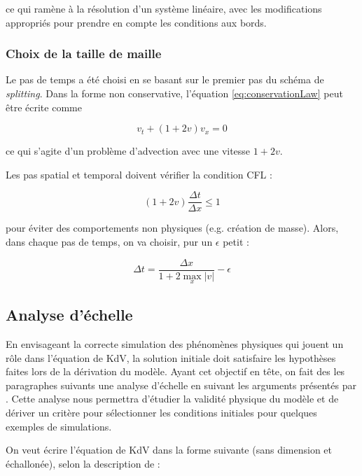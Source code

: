 \noindent ce qui ramène à la résolution d'un système linéaire, avec les modifications appropriés pour prendre en compte les conditions aux bords.

\subsubsection{Choix de la taille de maille}

\indent Le pas de temps a été choisi en se basant sur le premier pas du schéma de \emph{splitting}. Dans la forme non conservative, l'équation \eqref{eq:conservationLaw} peut être écrite comme

\begin{equation*}
v_t +  (1+2v)v_x = 0
\end{equation*}

\noindent ce qui s'agite d'un problème d'advection avec une vitesse $1+2v$.

\indent Les pas spatial et temporal doivent vérifier la condition CFL :

\begin{equation*}
(1+2v)\frac{\Delta t}{\Delta x} \leq 1
\end{equation*}

\noindent pour éviter des comportements non physiques (e.g. création de masse). Alors, dans chaque pas de temps, on va choisir, pur un $\epsilon$ petit :

\begin{equation*}
\Delta t = \frac{\Delta x}{1+2\max\limits_{x}|v|} - \epsilon
\end{equation*}

\subsection{Analyse d'échelle}

\indent En envisageant la correcte simulation des phénomènes physiques qui jouent un rôle dans l'équation de KdV, la solution initiale doit satisfaire les hypothèses faites lors de la dérivation du modèle. Ayant cet objectif en tête, on fait des les paragraphes suivants une analyse d'échelle en suivant les arguments présentés par \cite{BBM1971}. Cette analyse nous permettra d'étudier la validité physique du modèle et de dériver un critère pour sélectionner les conditions initiales pour quelques exemples de simulations.

\indent On veut écrire l'équation de KdV dans la forme suivante (sans dimension et échallonée), selon la description de \cite{BBM1971} :

